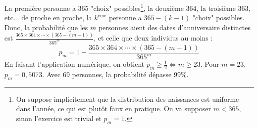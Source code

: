 La première personne a 365 "choix" possibles\footnote{On suppose implicitement que la distribution des naissances est uniforme dans l’année, ce qui est plutôt faux en pratique. On va supposer $m<365$, sinon l'exercice est trivial et $p_m=1$.}, la deuxième 364, la troisième 363, etc... de proche en proche, la $k^\textrm{\`eme}$ personne a $365-(k-1)$ "choix" possibles. Donc, la probabilité que les $m$ personnes aient des dates d'anniversaire distinctes est $\frac{365\times 364\times \cdots \times (365-(m-1))}{365^m}$, et celle que deux individus au moins : 
\[
p_m = 1-\frac{365\times 364\times \cdots \times (365-(m-1))}{365^m}
\]
En faisant l'application numérique, on obtient $p_m\geq \frac{1}{2} \Leftrightarrow m\geq 23$. Pour $m=23$, $p_m=0,5073$. Avec 69 personnes, la probabilité dépasse 99\%. 

